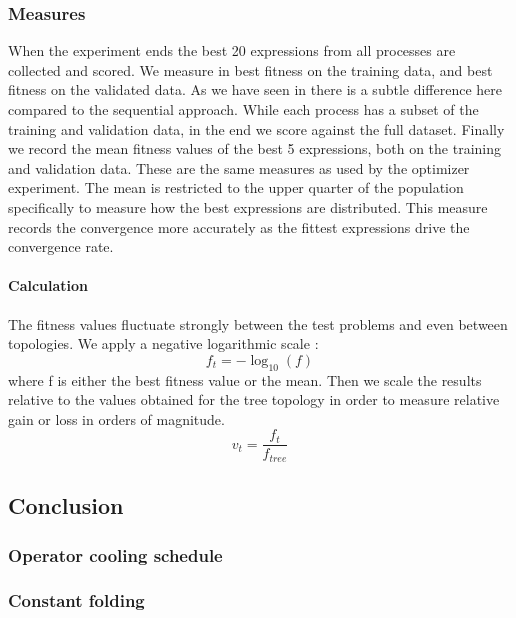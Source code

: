 \subsubsection{Measures}
When the experiment ends the best 20 expressions from all processes are collected and scored. We measure in best fitness on the training data, and best fitness on the validated data. As we have seen in %
there is a subtle difference here compared to the sequential approach. While each process has a subset of the training and validation data, in the end we score against the full dataset.
Finally we record the mean fitness values of the best 5 expressions, both on the training and validation data. These are the same measures as used by the optimizer experiment. The mean is restricted to the upper quarter of the population specifically to measure how the best expressions are distributed. This measure records the convergence more accurately as the fittest expressions drive the convergence rate. 
\paragraph{Calculation}
The fitness values fluctuate strongly between the test problems and even between topologies. We apply a negative logarithmic scale :
\[
f_t = -\log_{10}(f)
\]
where f is either the best fitness value or the mean. Then we scale the results relative to the values obtained for the tree topology in order to measure relative gain or loss in orders of magnitude.
\[
v_{t} = \frac{f_{t}}{f_{tree}}
\]
\subsection{Conclusion}
\subsubsection{Operator cooling schedule}
\subsubsection{Constant folding}
